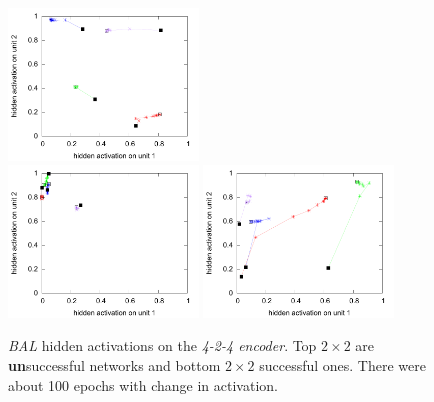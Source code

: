 \begin{figure}[H]
  \includegraphics[width=0.45\textwidth]{img/hid-bal-good-convex.pdf}  \\
  \includegraphics[width=0.45\textwidth]{img/hid-bal-good-step.pdf}  
  \includegraphics[width=0.45\textwidth]{img/hid-bal-good-stagnation.pdf}  \\ 
  \caption{\emph{BAL} hidden activations on the \emph{4-2-4 encoder}. Top $2\times2$ are {\bf un}successful networks and bottom $2\times2$ successful ones. There were about 100 epochs with change in activation.}
  \label{fig:results-hidden-activations-bal}
\end{figure}

